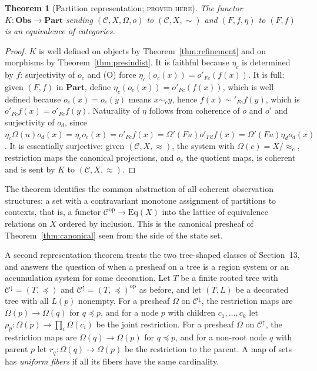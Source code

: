 \documentclass[11pt]{article}
\newtheorem{theorem}{Theorem}[section]
\theoremstyle{definition}
\theoremstyle{remark}
\newcommand{\stN}{\textsc{proved here}}
\newcommand{\cC}{\mathcal C}
\newcommand{\Obs}{\mathbf{Obs}}
\newcommand{\Part}{\mathbf{Part}}
\newcommand{\op}{\mathrm{op}}
\newcommand{\sk}{\sim}
\begin{document}
\begin{theorem}[Partition representation; \stN]\label{thm:partrep}
The functor $K:\Obs\to\Part$ sending $(\cC,X,\Omega,o)$ to $(\cC,X,{\sk})$ and $(F,f,\eta)$ to $(F,f)$ is an equivalence of categories.
\end{theorem}
\begin{proof}
$K$ is well defined on objects by Theorem~\ref{thm:refinement} and on morphisms by Theorem~\ref{thm:presindist}. It is faithful because $\eta_c$ is determined by $f$: surjectivity of $o_c$ and (O) force $\eta_c(o_c(x))=o'_{Fc}(f(x))$. It is full: given $(F,f)$ in $\Part$, define $\eta_c(o_c(x))=o'_{Fc}(f(x))$, which is well defined because $o_c(x)=o_c(y)$ means $x\sk_cy$, hence $f(x)\sk'_{Fc}f(y)$, which is $o'_{Fc}f(x)=o'_{Fc}f(y)$. Naturality of $\eta$ follows from coherence of $o$ and $o'$ and surjectivity of $o_d$, since $\eta_c\Omega(u)o_d(x)=\eta_co_c(x)=o'_{Fc}f(x)=\Omega'(Fu)o'_{Fd}f(x)=\Omega'(Fu)\eta_do_d(x)$. It is essentially surjective: given $(\cC,X,{\approx})$, the system with $\Omega(c)=X/{\approx_c}$, restriction maps the canonical projections, and $o_c$ the quotient maps, is coherent and is sent by $K$ to $(\cC,X,{\approx})$.
\end{proof}

The theorem identifies the common abstraction of all coherent observation structures: a set with a contravariant monotone assignment of partitions to contexts, that is, a functor $\cC^{\op}\to\mathrm{Eq}(X)$ into the lattice of equivalence relations on $X$ ordered by inclusion. This is the canonical presheaf of Theorem~\ref{thm:canonical} seen from the side of the state set.

A second representation theorem treats the two tree-shaped classes of Section~13, and answers the question of when a presheaf on a tree is a region system or an accumulation system for some decoration. Let $T$ be a finite rooted tree with $\cC^{\downarrow}=(T,\preceq)$ and $\cC^{\uparrow}=(T,\preceq)^{\op}$ as before, and let $(T,L)$ be a decorated tree with all $L(p)$ nonempty. For a presheaf $\Omega$ on $\cC^{\downarrow}$, the restriction maps are $\Omega(p)\to\Omega(q)$ for $q\preceq p$, and for a node $p$ with children $c_1,\dots,c_k$ let $\rho_p:\Omega(p)\to\prod_i\Omega(c_i)$ be the joint restriction. For a presheaf $\Omega$ on $\cC^{\uparrow}$, the restriction maps are $\Omega(q)\to\Omega(p)$ for $q\preceq p$, and for a non-root node $q$ with parent $p$ let $r_q:\Omega(q)\to\Omega(p)$ be the restriction to the parent. A map of sets has \emph{uniform fibers} if all its fibers have the same cardinality.
\end{document}
